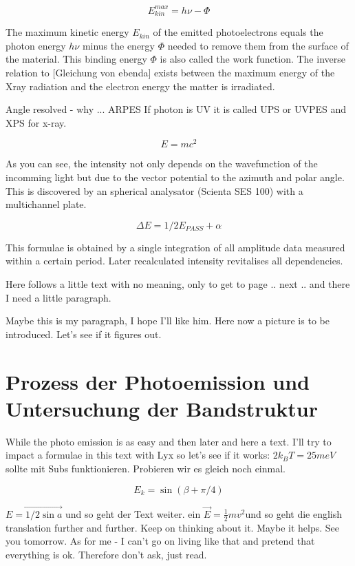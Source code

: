 \documentclass[11pt,twoside,german]{book}
\begin{document}
\begin{equation}
E_{kin}^{max}=h\nu - \Phi
\end{equation}

The maximum kinetic energy $E_{kin}$ of the emitted photoelectrons equals the photon energy $h\nu$ minus the 
energy $\Phi$ needed to remove them from the surface of the material. This binding energy  $\Phi$ is 
also called the work function. The inverse relation to [Gleichung von ebenda] exists between the maximum 
energy of the Xray radiation and the electron energy the matter is irradiated.

Angle resolved - why ... ARPES
If photon is UV it is called UPS or UVPES and XPS for x-ray.


\[E=mc^{2}\]

As you can see, the intensity not only depends on the wavefunction of the incomming light but due to the vector potential to the azimuth and polar angle. This is discovered by an spherical analysator (Scienta SES 100) with a multichannel plate.

\[\Delta E=1/2E_{PASS}+\alpha\]

This formulae is obtained by a single integration of all amplitude
data measured within a certain period. Later recalculated intensity
revitalises all dependencies. 

Here follows a little text with no meaning, only to get to page ..
next .. and there I need a little paragraph.

Maybe this is my paragraph, I hope I'll like him. Here now a picture
is to be introduced. Let's see if it figures out.


\section{Prozess der Photoemission und Untersuchung der Bandstruktur}

While the photo emission is as easy and then later and here a text.
I'll try to impact a formulae in this text with Lyx so let's see if
it works: $2k_{B}T=25meV$ sollte mit Subs funktionieren. Probieren
wir es gleich noch einmal.

\[E_{k}=\sin(\beta+\pi/4)\]

$\vec{E=1/2\sin a}$ und so geht der Text weiter. ein $\vec{E}=\frac{1}{2}mv^{2}$und
so geht die english translation further and further. Keep on thinking
about it. Maybe it helps. See you tomorrow. As for me - I can't go
on living like that and pretend that everything is ok. Therefore don't
ask, just read.
\end{document}
